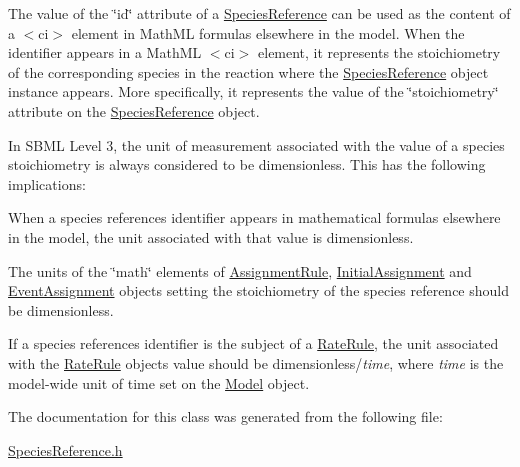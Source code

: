 The value of the \char`\"{}id\char`\"{} attribute of a \hyperlink{class_species_reference}{Species\+Reference} can be used as the content of a {\ttfamily $<$ci$>$} element in Math\+ML formulas elsewhere in the model. When the identifier appears in a Math\+ML {\ttfamily $<$ci$>$} element, it represents the stoichiometry of the corresponding species in the reaction where the \hyperlink{class_species_reference}{Species\+Reference} object instance appears. More specifically, it represents the value of the \char`\"{}stoichiometry\char`\"{} attribute on the \hyperlink{class_species_reference}{Species\+Reference} object.

In S\+B\+ML Level 3, the unit of measurement associated with the value of a species\textquotesingle{} stoichiometry is always considered to be {\ttfamily dimensionless}. This has the following implications\+: 
\begin{DoxyItemize}
\item When a species reference\textquotesingle{}s identifier appears in mathematical formulas elsewhere in the model, the unit associated with that value is {\ttfamily dimensionless}.


\item The units of the \char`\"{}math\char`\"{} elements of \hyperlink{class_assignment_rule}{Assignment\+Rule}, \hyperlink{class_initial_assignment}{Initial\+Assignment} and \hyperlink{class_event_assignment}{Event\+Assignment} objects setting the stoichiometry of the species reference should be {\ttfamily dimensionless}.


\item If a species reference\textquotesingle{}s identifier is the subject of a \hyperlink{class_rate_rule}{Rate\+Rule}, the unit associated with the \hyperlink{class_rate_rule}{Rate\+Rule} object\textquotesingle{}s value should be {\ttfamily dimensionless}/{\itshape time}, where {\itshape time} is the model-\/wide unit of time set on the \hyperlink{class_model}{Model} object.


\end{DoxyItemize}

The documentation for this class was generated from the following file\+:\begin{DoxyCompactItemize}
\item 
\hyperlink{_species_reference_8h}{Species\+Reference.\+h}\end{DoxyCompactItemize}
